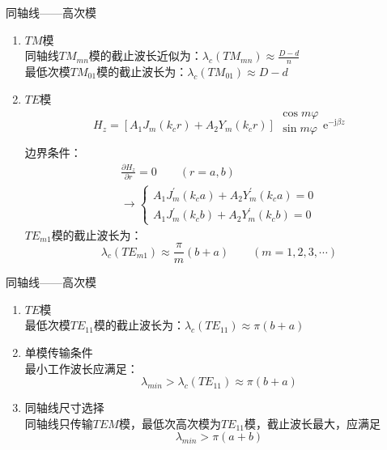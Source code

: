 \begin{frame}{同轴线——高次模}
    \begin{enumerate}
        \item $TM$模\\
        同轴线$TM_{mn}$模的截止波长近似为：$\lambda_c(TM_{mn})\approx\frac{D-d}{n}$\\
        最低次模$TM_{01}$模的截止波长为：$\lambda_c(TM_{01})\approx D-d$
        \item $TE$模
        \begin{gather*}
            H_z=[A_1J_m(k_cr)+A_2Y_m(k_cr)]
            \begin{matrix*}
                \cos m\varphi\\
                \sin m\varphi\\
            \end{matrix*}
            \mathrm{e}^{-\mathrm{j}\beta z}
        \end{gather*}
        边界条件：
        \begin{gather*}
            \frac{\partial H_z}{\partial r}=0\qquad(r=a,b)\\
            \rightarrow
            \begin{cases}
                A_1J_m^{'}(k_ca)+A_2Y_m^{'}(k_ca)=0\\
                A_1J_m^{'}(k_cb)+A_2Y_m^{'}(k_cb)=0
            \end{cases}
        \end{gather*}
        $TE_{m1}$模的截止波长为：
        $$\lambda_c(TE_{m1})\approx\frac{\pi}{m}(b+a)\qquad(m=1,2,3,\cdots)$$
        \saveenum
    \end{enumerate}
\end{frame}

\begin{frame}{同轴线——高次模}
    \begin{enumerate}
        \resume
        \item $TE$模\\
        最低次模$TE_{11}$模的截止波长为：$\lambda_c(TE_{11})\approx \pi(b+a)$
        \item 单模传输条件\\
        最小工作波长应满足：
        $$\lambda_{min}>\lambda_c(TE_{11})\approx\pi(b+a)$$
        \item 同轴线尺寸选择\\
        同轴线只传输$TEM$模，最低次高次模为$TE_{11}$模，截止波长最大，应满足
        $$\lambda_{min}>\pi(a+b)$$
    \end{enumerate}
\end{frame}

